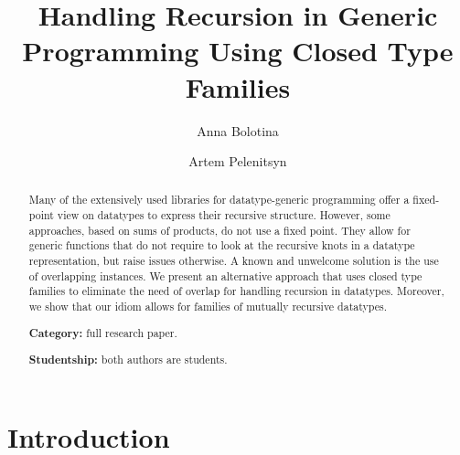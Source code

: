 \documentclass[runningheads]{llncs}
\begin{document}
%
\title{Handling Recursion in Generic Programming Using Closed Type Families}
%
%
\author{Anna Bolotina \and
Artem Pelenitsyn
}
%
%
%
\maketitle              %
%
\begin{abstract}
Many of the extensively used libraries for datatype-generic programming offer a fixed-point view on datatypes to express their recursive structure. However, some approaches, based on sums of products, do not use a fixed point. They allow for generic functions that do not require to look at the recursive knots in a datatype representation, but raise issues otherwise. A known and unwelcome solution is the use of overlapping instances. We present an alternative approach that uses closed type families to eliminate the need of overlap for handling recursion in datatypes. Moreover, we show that our idiom allows for families of mutually recursive datatypes.


\textbf{Category:} full research paper.

\textbf{Studentship:} both authors are students.


\end{abstract}
%
%
%
\section{Introduction}
\label{sec:introduction}
\end{document}
